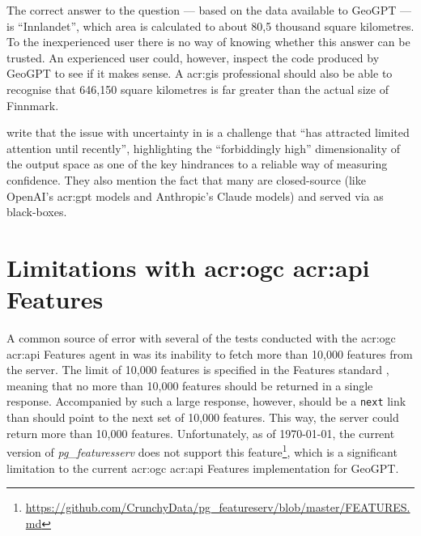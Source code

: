 The correct answer to the question --- based on the data available to GeoGPT --- is \enquote{Innlandet}, which area is calculated to about 80,5 thousand square kilometres. To the inexperienced user there is no way of knowing whether this answer can be trusted. An experienced user could, however, inspect the code produced by GeoGPT to see if it makes sense. A \acrshort{acr:gis} professional should also be able to recognise that 646,150 square kilometres is far greater than the actual size of Finnmark.

\citep[1-2]{linGeneratingConfidenceUncertainty2023} write that the issue with uncertainty in  is a challenge that \enquote{has attracted limited attention until recently}, highlighting the \enquote{forbiddingly high} dimensionality of the output space as one of the key hindrances to a reliable way of measuring confidence. They also mention the fact that many  are closed-source (like OpenAI's \acrshort{acr:gpt} models and Anthropic's Claude models) and served via  as black-boxes.

\section[Limitations with OGC API Features]{Limitations with \acrshort{acr:ogc} \acrshort{acr:api} Features}
\label{sec:difficulties-with-oaf}

A common source of error with several of the tests conducted with the \acrshort{acr:ogc} \acrshort{acr:api} Features agent in was its inability to fetch more than 10,000 features from the server. The limit of 10,000 features is specified in the Features standard \citep{opengeospatialconsortiumOGCAPIFeatures2022}, meaning that no more than 10,000 features should be returned in a single response. Accompanied by such a large response, however, should be a \texttt{next} link than should point to the next set of 10,000 features. This way, the server could return more than 10,000 features. Unfortunately, as of \today, the current version of \textit{pg\_featuresserv} does not support this feature\footnote{\url{https://github.com/CrunchyData/pg_featureserv/blob/master/FEATURES.md}}, which is a significant limitation to the current \acrshort{acr:ogc} \acrshort{acr:api} Features implementation for GeoGPT.

